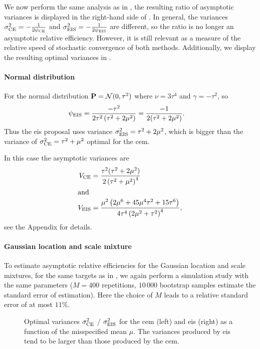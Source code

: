 \begin{example}
    We now perform the same analysis as in , the resulting ratio of asymptotic variances is displayed in the right-hand side of . In general, the variances $\sigma^{2}_{\ce} = -\frac{1}{2\pce}$ and $\sigma^{2}_{\eis} = -\frac{1}{2\peis}$ are different, so the ratio is no longer an asymptotic relative efficiency. However, it is still relevant as a measure of the relative speed of stochastic convergence of both methods. Additionally, we display the resulting optimal variances in .

    \paragraph{Normal distribution}
    For the normal distribution $\P = \mathcal N (0, \tau^{2})$ where $\nu = 3 \tau^{4}$ and $\gamma = -\tau^{2}$, so 
    \begin{align*}
        \peis &= \frac{-\tau^{2}}{2\tau^{2} \left( \tau^{2} + 2\mu^{2} \right)} = \frac{-1}{2(\tau^{2} + 2\mu^{2})}.
    \end{align*}
    Thus the \gls{eis} proposal uses variance $\sigma^{2}_{\eis} = \tau^{2} + 2\mu^{2}$, which is bigger than the variance of $\sigma^{2}_{\ce} = \tau^{2} + \mu^{2}$ optimal for the \gls{cem}.

    In this case the asymptotic variances are
    \begin{align*}
        V_{\ce} &= \frac{\tau^{2}(\tau^{2} + 2\mu^{2})}{2 \left( \tau^{2} + \mu^{2} \right)^{4}}\\
        \intertext{and}
        V_{\eis} &= \frac{\mu^{2} \left(2 \mu^{6} + 45 \mu^{4} \tau^{2} + 15 \tau^{6}\right)}{4 \tau^{4} \left(2 \mu^{2} + \tau^{2}\right)^{4}},
    \end{align*}
    see the Appendix for details. 

    \paragraph{Gaussian location and scale mixture}
    To estimate asymptotic relative efficiencies for the Gaussian location and scale mixtures, for the same targets as in , we again perform a simulation study with the same parameters ($M = 400 $ repetitions, $10\,000$ bootstrap samples estimate the standard error of estimation).
    Here the choice of $M$ leads to a relative standard error of at most $11\%$. 
\end{example}
\begin{figure}
    \centering

    \resizebox{\textwidth}{!}{%
    }
    \caption{Optimal variances $\sigma^{2}_{\ce}$ / $\sigma^{2}_\eis$ for the \acrshort{cem} (left) and \acrshort{eis} (right) as a function of the misspecified mean $\mu$. The variances produced by \acrshort{eis} tend to be larger than those produced by the \acrshort{cem}.}
    \label{fig:cem_eis_sigma2}
\end{figure}

